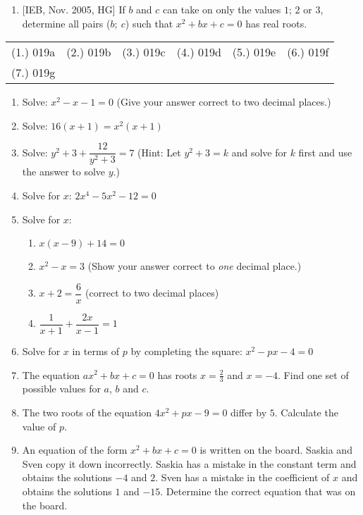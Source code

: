 {{\begin{enumerate}
\item{[IEB, Nov. 2005, HG] If $b$ and $c$ can take on only the values $1$; $2$ or $3$, determine all pairs ($b; \: c$) such that $x^2+bx+c=0$ has real roots.}
\end{enumerate}


\par \practiceinfo
\par \begin{tabular}[h]{cccccc}
(1.)	019a	&
(2.)	019b	&
(3.)	019c	&
(4.)	019d	&
(5.)	019e	&
(6.)	019f	\\ %
(7.)	019g	&
\end{tabular}}

\begin{eocexercises}{}
\begin{enumerate}
\item{Solve: $x^2 - x - 1 = 0$ \quad (Give your answer correct to two decimal places.)}
\item{Solve: $16(x+1) = x^2 (x+1)$}
\item{Solve: $y^2 + 3 + \dfrac{12}{y^2 + 3} = 7$ \quad
(Hint:  Let $y^2+3 = k$ and solve for $k$ first and use the answer to solve $y$.)}
\item{Solve for $x$: $2x^4 - 5x^2 - 12 = 0$}
\item{Solve for $x$:
\begin{enumerate}
\item{$x(x-9)+14 = 0$}
\item{$x^2  - x = 3$ \quad (Show your answer correct to \textit{one} decimal place.)}
\item{$x + 2 = \dfrac{6}{x}$ \quad (correct to two decimal places)}
\item{$\dfrac{1}{x+1}+\dfrac{2x}{x-1} = 1$}
\end{enumerate}}
\item{Solve for $x$ in terms of $p$ by completing the square: $x^2 - px - 4 = 0$}
\item{The equation $ax^2 + bx + c = 0$ has roots $x=\tfrac{2}{3}$ and $x=-4$. Find one set of possible values for $a$, $b$ and $c$.}

\item{The two roots of the equation $4x^2 + px - 9 = 0$ differ by $5$. Calculate the value of $p$.}

\item{ An equation of the form $x^2 + bx + c = 0$ is written
on the board. Saskia and Sven copy it down incorrectly. Saskia has
a mistake in the constant term and obtains the solutions $-4$ and $2$.
Sven has a mistake in the coefficient of $x$ and obtains the solutions
$1$ and $-15$. Determine the correct equation that was on the
board.}


\end{enumerate}
\end{eocexercises}}
